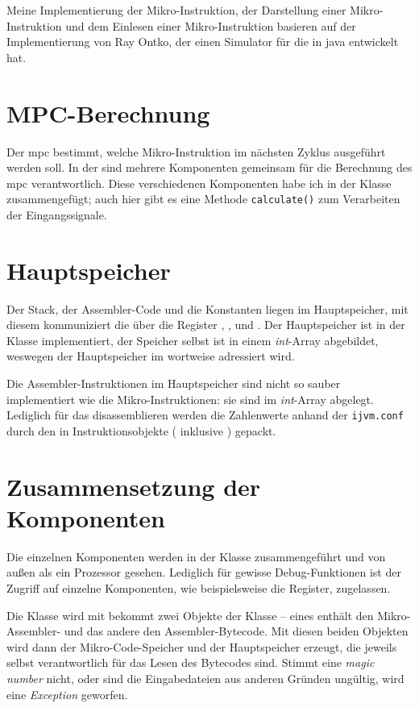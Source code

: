 Meine Implementierung der Mikro-Instruktion, der Darstellung einer Mikro-Instruktion und dem Einlesen einer Mikro-Instruktion basieren auf der Implementierung von Ray Ontko, der einen Simulator für die \mic in \gls{java} entwickelt hat.

\section{MPC-Berechnung}
Der \gls{mpc} bestimmt, welche Mikro-Instruktion im nächsten Zyklus ausgeführt werden soll. In der \mic sind mehrere Komponenten gemeinsam für die Berechnung des \gls{mpc} verantwortlich. Diese verschiedenen Komponenten habe ich in der Klasse  zusammengefügt; auch hier gibt es eine Methode \texttt{calculate()} zum Verarbeiten der Eingangssignale.

\section{Hauptspeicher}
Der Stack, der Assembler-Code und die Konstanten liegen im Hauptspeicher, mit diesem kommuniziert die \mic über die Register , ,  und . Der Hauptspeicher ist in der Klasse  implementiert, der Speicher selbst ist in einem \emph{int}-Array abgebildet, weswegen der Hauptspeicher im \md wortweise adressiert wird.

Die Assembler-Instruktionen im Hauptspeicher sind nicht so sauber implementiert wie die Mikro-Instruktionen: sie sind im \emph{int}-Array abgelegt. Lediglich für das disassemblieren werden die Zahlenwerte anhand der \texttt{ijvm.conf} durch den  in Instruktionsobjekte ( inklusive ) gepackt.

\section{Zusammensetzung der Komponenten}
Die einzelnen Komponenten werden in der Klasse  zusammengeführt und von außen als ein Prozessor gesehen. Lediglich für gewisse Debug-Funktionen ist der Zugriff auf einzelne Komponenten, wie beispielsweise die Register, zugelassen.

Die Klasse  wird mit bekommt zwei Objekte der Klasse  -- eines enthält den Mikro-Assembler- und das andere den Assembler-Bytecode. Mit diesen beiden Objekten wird dann der Mikro-Code-Speicher und der Hauptspeicher erzeugt, die jeweils selbst verantwortlich für das Lesen des Bytecodes sind. Stimmt eine \emph{magic number} nicht, oder sind die Eingabedateien aus anderen Gründen ungültig, wird eine \emph{Exception} geworfen.

